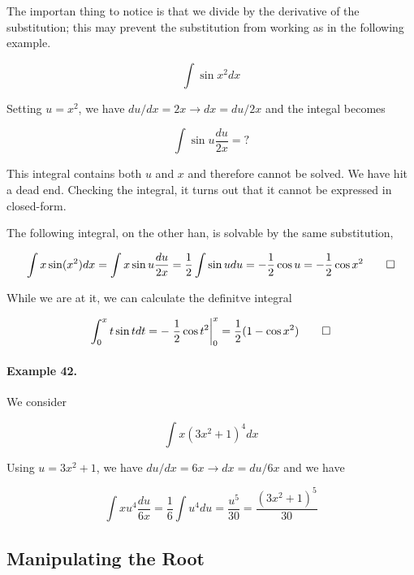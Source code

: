 The importan thing to notice is that we divide by the derivative of the substitution; this may prevent the substitution from working as in the following example.

\begin{equation*}
    \int \sin x^2 dx
\end{equation*}

Setting $u = x^2$, we have $du/dx = 2x \rightarrow dx = du / 2x$ and the integal becomes

\begin{equation*}
    \int \sin u \frac{du}{2x} = ?
\end{equation*}

This integral contains both $u$ and $x$ and therefore cannot be solved. We have hit a dead end. Checking the integral, it turns out that it cannot be expressed in closed-form.

The following integral, on the other han, is solvable by the same substitution,

\begin{equation*}
    \int x \sin(x^2) dx = \int x \sin u \frac{du}{2x} = \frac{1}{2} \int \sin u du = - \frac{1}{2} \cos u = - \frac{1}{2} \cos x^2 \qed
\end{equation*}

While we are at it, we can calculate the definitve integral

\begin{equation*}
    \int_0^x t \sin t dt = - \left. \frac{1}{2}  \cos t^2 \right|_0^x = \frac{1}{2} (1 - \cos x^2) \qed
\end{equation*}



\paragraph{Example 42.} We consider

\begin{equation*}
    \int x (3x^2 + 1)^4 dx
\end{equation*}

Using $u = 3x^2 + 1$, we have $du/dx = 6x \rightarrow dx = du / 6x$ and we have

\begin{equation*}
    \int x u^4 \frac{du}{6x} = \frac{1}{6} \int u^4 du = \frac{u^5}{30} = \frac{(3x^2+1)^5}{30}
\end{equation*}

\subsection{Manipulating the Root}

